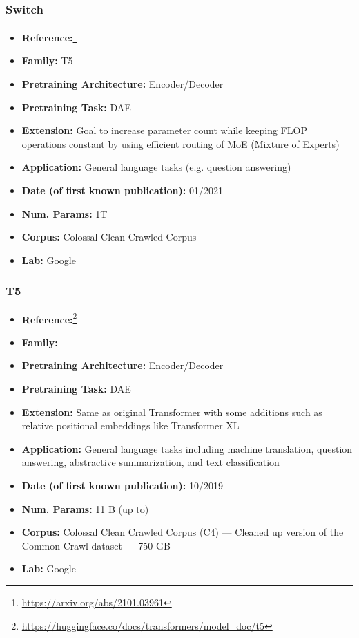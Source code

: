 \documentclass{article}
\begin{document}
\subsubsection{Switch}

            \begin{itemize}
                \item \textbf{Reference:}\footnote{\url{https://arxiv.org/abs/2101.03961}}\cite{fedus2021switch}
                \item \textbf{Family:} T5 
                \item \textbf{Pretraining Architecture:} Encoder/Decoder
                \item \textbf{Pretraining Task:} DAE
                \item \textbf{Extension:} Goal to increase parameter count while keeping FLOP operations constant by using efficient routing of MoE (Mixture of Experts)  
                \item \textbf{Application:} General language tasks (e.g. question answering)
                \item \textbf{Date (of first known publication):} 01/2021
                \item \textbf{Num. Params:} 1T
                \item \textbf{Corpus:} Colossal Clean Crawled Corpus
                \item \textbf{Lab:} Google
            \end{itemize}

\subsubsection{T5}

            \begin{itemize}
                \item \textbf{Reference:}\footnote{\url{https://huggingface.co/docs/transformers/model_doc/t5}}\cite{raffel2020exploring}
                \item \textbf{Family:}  
                \item \textbf{Pretraining Architecture:} Encoder/Decoder
                \item \textbf{Pretraining Task:} DAE
                \item \textbf{Extension:} Same as original Transformer with some additions such as relative positional embeddings like Transformer XL  
                \item \textbf{Application:} General language tasks including machine translation, question answering, abstractive summarization, and text classification
                \item \textbf{Date (of first known publication):} 10/2019
                \item \textbf{Num. Params:} 11 B (up to)
                \item \textbf{Corpus:} Colossal Clean Crawled Corpus (C4) — Cleaned up version of the Common Crawl dataset — 750 GB
                \item \textbf{Lab:} Google
            \end{itemize}
 
\end{document}
